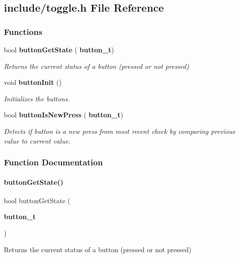 \subsection{include/toggle.h File Reference}
\label{toggle_8h}
\subsubsection*{Functions}
\begin{DoxyCompactItemize}
\item 
bool \textbf{ button\+Get\+State} (\textbf{ button\+\_\+t})
\begin{DoxyCompactList}\small\item\em Returns the current status of a button (pressed or not pressed) \end{DoxyCompactList}\item 
void \textbf{ button\+Init} ()
\begin{DoxyCompactList}\small\item\em Initializes the buttons. \end{DoxyCompactList}\item 
bool \textbf{ button\+Is\+New\+Press} (\textbf{ button\+\_\+t})
\begin{DoxyCompactList}\small\item\em Detects if button is a new press from most recent check by comparing previous value to current value. \end{DoxyCompactList}\end{DoxyCompactItemize}


\subsubsection{Function Documentation}
\mbox{\label{toggle_8h_a72989c21af9d14672f6e59c44a2b59bc}} 
\paragraph{button\+Get\+State()}
{\footnotesize\ttfamily bool button\+Get\+State (\begin{DoxyParamCaption}\item[{\textbf{ button\+\_\+t}}]{ }\end{DoxyParamCaption})}



Returns the current status of a button (pressed or not pressed) 



